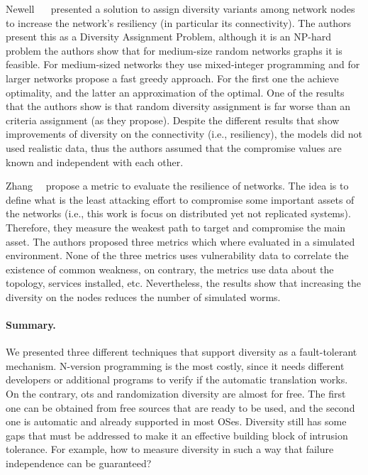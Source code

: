 Newell~\etal{} ~\cite{Newell:2015} presented a solution to assign diversity variants among network nodes to increase the network's resiliency (in particular its connectivity).
The authors present this as a Diversity Assignment Problem, although it is an NP-hard problem the authors show that for medium-size random networks graphs it is feasible.
For medium-sized networks they use mixed-integer programming and for larger networks propose a fast greedy approach.
For the first one the achieve optimality, and the latter an approximation of the optimal.
One of the results that the authors show is that random diversity assignment is far worse than an criteria assignment (as they propose).
Despite the different results that show improvements of diversity on the connectivity (i.e., resiliency), the models did not used realistic data, thus the authors assumed that the compromise values are known and independent with each other.


Zhang~\etal{}~\cite{Zhang:2016} propose a metric to evaluate the resilience of networks.
The idea is to define what is the least attacking effort to compromise some important assets of the networks (i.e., this work is focus on distributed yet not replicated systems).
Therefore, they measure the weakest path to target and compromise the main asset. 
The authors proposed three metrics which where evaluated in a simulated environment.
None of the three metrics uses vulnerability data to correlate the existence of common weakness, on contrary, the metrics use data about the topology, services installed, etc.
Nevertheless, the results show that increasing the diversity on the nodes reduces the number of simulated worms.
 

\paragraph{Summary.}
We presented three different techniques that support diversity as a fault-tolerant mechanism. 
N-version programming is the most costly, since it needs different developers or additional programs to verify if the automatic translation works. 
On the contrary, \gls{ots} and randomization diversity are almost for free. 
The first one can be obtained from free sources that are ready to be used, and the second one is automatic and already supported
in most OSes. 
Diversity still has some gaps that must be addressed to make it an effective building block of intrusion tolerance. 
For example, how to measure diversity in such a way that failure independence can be guaranteed?



